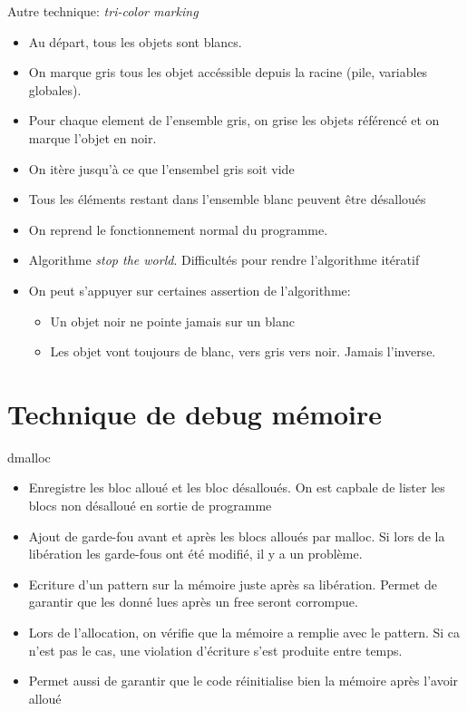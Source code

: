\begin{frame}[fragile=singleslide]{Autre   technique:  \emph{tri-color
      marking}}
  \begin{itemize}
  \item Au départ, tous les objets sont blancs.
  \item  On marque  gris tous  les objet  accéssible depuis  la racine
    (pile, variables globales).
  \item Pour  chaque element de  l'ensemble gris, on grise  les objets
    référencé et on marque l'objet en noir.
  \item On itère jusqu'à ce que l'ensembel gris soit vide
  \item Tous  les éléments restant dans l'ensemble  blanc peuvent être
    désalloués
  \item On reprend le fonctionnement normal du programme.
  \item  Algorithme \emph{stop  the world}.   Difficultés  pour rendre
    l'algorithme itératif
  \item On peut s'appuyer sur certaines assertion de l'algorithme:
    \begin{itemize}
    \item Un objet noir ne pointe jamais sur un blanc
    \item  Les   objet  vont  toujours   de  blanc,  vers   gris  vers
      noir. Jamais l'inverse.
    \end{itemize}
  \end{itemize}
\end{frame}

\section{Technique de debug mémoire}

\begin{frame}[fragile=singleslide]{dmalloc}
  \begin{itemize}
  \item  Enregistre les  bloc alloué  et les  bloc désalloués.  On est
    capbale de lister les blocs non désalloué en sortie de programme
  \item  Ajout de  garde-fou  avant  et après  les  blocs alloués  par
    malloc. Si lors  de la libération les garde-fous  ont été modifié,
    il y a un problème.
  \item  Ecriture   d'un  pattern  sur  la  mémoire   juste  après  sa
    libération. Permet  de garantir que  les donné lues après  un free
    seront corrompue.
  \item Lors de l'allocation, on vérifie que la mémoire a remplie avec
    le pattern. Si ca n'est pas le cas, une violation d'écriture s'est
    produite entre temps.
  \item  Permet aussi  de garantir  que le  code réinitialise  bien la
    mémoire après l'avoir alloué
  \end{itemize}
\end{frame}

